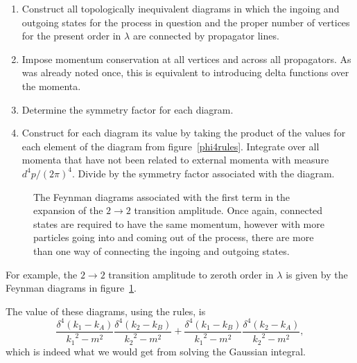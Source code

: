 \begin{enumerate}
\item Construct all topologically inequivalent diagrams in which the ingoing and outgoing states for the process in question and the proper number of vertices for the present order in $\lambda$ are connected by propagator lines.
\item Impose momentum conservation at all vertices and across all propagators. As was already noted once, this is equivalent to introducing delta functions over the momenta.
\item Determine the symmetry factor for each diagram.
\item Construct for each diagram its value by taking the product of the values for each element of the diagram from figure~\ref{phi4rules}. Integrate over all momenta that have not been related to external momenta with measure $d^4p/(2\pi)^4$. Divide by the symmetry factor associated with the diagram.
\end{enumerate}

\begin{figure}[htp]
\begin{footnotesize}\begin{center}
\end{center}\end{footnotesize}
\caption{The Feynman diagrams associated with the first term in the expansion of the $2\rightarrow2$ transition amplitude. Once again, connected states are required to have the same momentum, however with more particles going into and coming out of the process, there are more than one way of connecting the ingoing and outgoing states.
\label{efeydig1}}
\end{figure}


For example, the $2\rightarrow2$ transition amplitude to zeroth order in $\lambda$ is given by the Feynman diagrams in figure~\ref{efeydig1}.

The value of these diagrams, using the rules, is
\[\frac{\delta^4(k_1-k_A)}{{k_1}^2-m^2}\frac{\delta^4(k_2-k_B)}{{k_2}^2-m^2}+\frac{\delta^4(k_1-k_B)}{{k_1}^2-m^2}\frac{\delta^4(k_2-k_A)}{{k_2}^2-m^2},\]
which is indeed what we would get from solving the Gaussian integral. 

